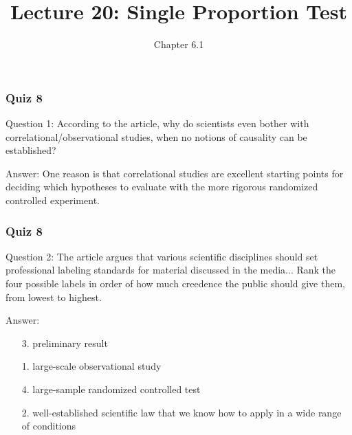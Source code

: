 \documentclass[handout]{beamer}
\title{Lecture 20: Single Proportion Test}
\author{Chapter 6.1}
\date{}
\newcommand{\blue}[1]{\textcolor{blue2}{#1}}
\begin{document}
\begin{frame}
\titlepage
\end{frame}


\begin{frame}[fragile]
\frametitle{Quiz 8}

\blue{Question 1}: According to the article, why do scientists even bother with correlational/observational studies, when no notions of causality can be established?

\vspace{0.5cm}

\pause\blue{Answer}:  One reason is that correlational studies are excellent starting points for deciding which hypotheses to evaluate with the more rigorous randomized controlled experiment.

\end{frame}


\begin{frame}[fragile]
\frametitle{Quiz 8}

\blue{Question 2}: The article argues that various scientific disciplines should set professional labeling standards for material discussed in the media...  Rank the four possible labels in order of how much creedence the public should give them, from lowest to highest.  

\vspace{0.5cm}

\pause\blue{Answer}:
\begin{enumerate}
\item[3.] preliminary result
\item[1.] large-scale observational study
\item[4.] large-sample randomized controlled test
\item[2.] well-established scientific law that we know how to apply in a wide range of conditions
\end{enumerate}

\end{frame}
\end{document}
